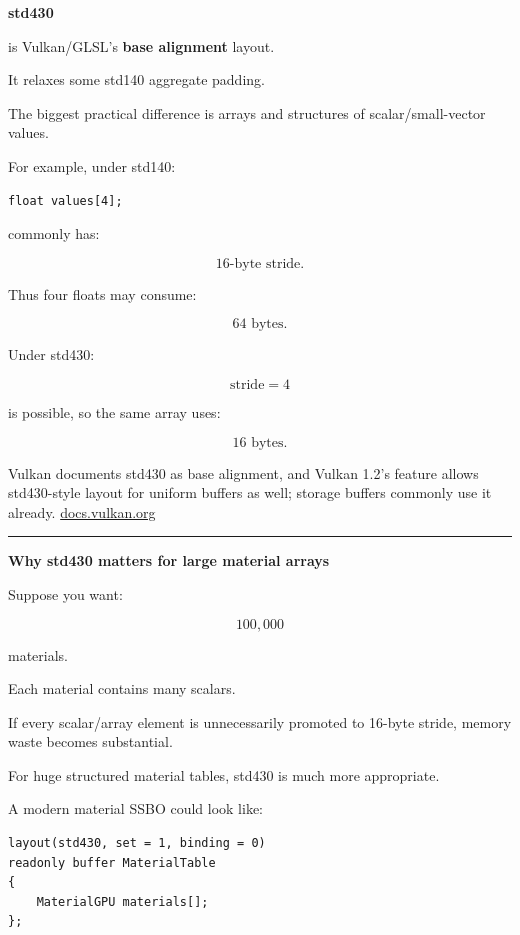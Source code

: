 \textbf{std430}

 is Vulkan/GLSL's \textbf{base alignment} layout.

It relaxes some std140 aggregate padding.

The biggest practical difference is arrays and structures of scalar/small-vector values.

For example, under std140:

\begin{verbatim}
float values[4];
\end{verbatim}

commonly has:

\[
16\text{-byte stride}.
\]

Thus four floats may consume:

\[
64\text{ bytes}.
\]

Under std430:

\[
\text{stride}=4
\]

is possible, so the same array uses:

\[
16\text{ bytes}.
\]

Vulkan documents std430 as base alignment, and Vulkan 1.2's  feature allows std430-style layout for uniform buffers as well; storage buffers commonly use it already. \href{https://docs.vulkan.org/guide/latest/shader_memory_layout.html?utm_source=chatgpt.com}{docs.vulkan.org}

\begin{center}\rule{0.5\linewidth}{0.5pt}\end{center}

\textbf{Why std430 matters for large material arrays}

Suppose you want:

\[
100,000
\]

materials.

Each material contains many scalars.

If every scalar/array element is unnecessarily promoted to 16-byte stride, memory waste becomes substantial.

For huge structured material tables, std430 is much more appropriate.

A modern material SSBO could look like:

\begin{verbatim}
layout(std430, set = 1, binding = 0)
readonly buffer MaterialTable
{
    MaterialGPU materials[];
};
\end{verbatim}

